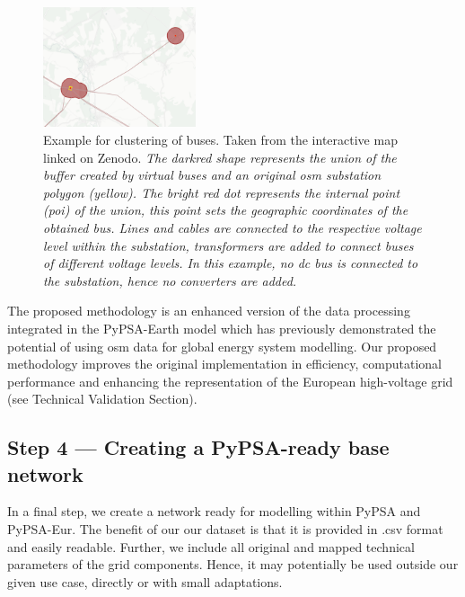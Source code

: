 \documentclass[fleqn,10pt]{wlscirep}
\let\autocite\cite
\begin{document}
\begin{figure}[h]
    \centering
    \includegraphics[width=0.4\textwidth]{figures/fig_example_clustering.png}
    \caption{Example for clustering of buses. Taken from the interactive map linked on Zenodo. \cite{xiongPrebuiltElectricityNetwork2024} \textit{The darkred shape represents the union of the buffer created by virtual buses and an original \acrshort{osm} substation polygon (yellow). The bright red dot represents the internal point (\acrshort{poi}) of the union, this point sets the geographic coordinates of the obtained bus. Lines and cables are connected to the respective voltage level within the substation, transformers are added to connect buses of different voltage levels. In this example, no \acrshort{dc} bus is connected to the substation, hence no converters are added.}}
    \label{fig:example_clustering}
\end{figure}
The proposed methodology is an enhanced version of the data processing integrated in the PyPSA-Earth model \autocite{parzenPyPSAEarthNewGlobal2023} which has previously demonstrated the potential of using \acrshort{osm} data for global energy system modelling. Our proposed methodology improves the original implementation in efficiency, computational performance and enhancing the representation of the European high-voltage grid (see Technical Validation Section).

\subsection*{Step 4 --- Creating a PyPSA-ready base network}
In a final step, we create a network ready for modelling within PyPSA and PyPSA-Eur. The benefit of our our dataset is that it is provided in .csv format and easily readable. Further, we include all original and mapped technical parameters of the grid components. Hence, it may potentially be used outside our given use case, directly or with small adaptations. 
\end{document}
